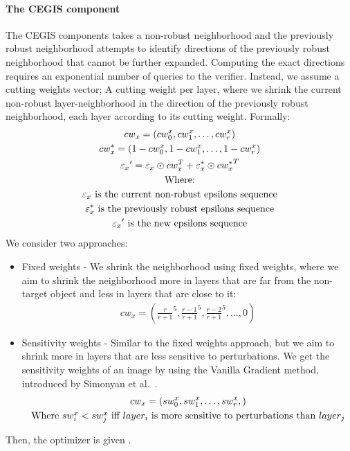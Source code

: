     \paragraph{The CEGIS component}
    The CEGIS components takes a non-robust neighborhood and the previously robust neighborhood attempts to identify directions of the previously robust neighborhood that cannot be further expanded. %
    Computing the exact directions requires an exponential number of queries to the verifier.
    Instead, we assume a cutting weights vector;
    A cutting weight per layer, where we shrink the current non-robust layer-neighborhood in the direction of the previously robust neighborhood, each layer according to its cutting weight.
    Formally:
    \begin{gather*}
        cw_x = (cw_0^x, cw_1^x, \ldots, cw_r^x)\\
        cw_x^* = (1 - cw_0^x, 1 - cw_1^x, \ldots, 1 - cw_r^x)\\
        {\varepsilon_x}' = \varepsilon_x \odot cw_x^T + \varepsilon_x^* \odot {cw_x^*}^T\\
        $Where:$\\
        \varepsilon_x $ is the current non-robust epsilons sequence$\\
        \varepsilon_x^* $ is the previously robust epsilons sequence$\\
        {\varepsilon_x}' $ is the new epsilons sequence$\\
    \end{gather*}
    We consider two approaches:
    \begin{itemize}
        \item Fixed weights - We shrink the neighborhood using fixed weights, where we aim to shrink the neighborhood more in layers that are far from the non-target object and less in layers that are close to it:
        \begin{gather*}
            cw_x = ({\frac{r}{r+1}}^5, {\frac{r-1}{r+1}}^5, {\frac{r-2}{r+1}}^5, \ldots, 0)
        \end{gather*}
        \item Sensitivity weights - Similar to the fixed weights approach, but we aim to shrink more in layers that are less sensitive to perturbations.
        We get the sensitivity weights of an image by using the Vanilla Gradient method, introduced by Simonyan et al.~\cite{VANILLAGRADIENT}.
        \begin{gather*}
            cw_x = (sw_0^x, sw_1^x, \ldots, sw_r^x,)\\
            $Where $sw_i^x < sw_j^x$ iff $layer_i$ is more sensitive to perturbations than $layer_j\\
        \end{gather*}
    \end{itemize}
    Then, the optimizer is given . %

